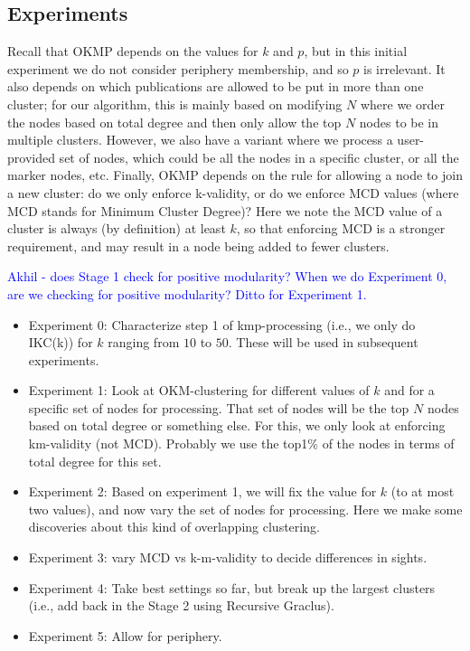 \documentclass{article}
\begin{document}
\subsection{Experiments}

 
Recall that OKMP depends on the values for $k$ and $p$, but in this initial experiment we do not 
consider periphery membership, and so $p$ is irrelevant.
It also depends on which publications are allowed to be
put in more than one cluster; for our algorithm, this is mainly based on modifying $N$ where 
we order the nodes based on total degree and then only allow the top $N$ nodes to be in multiple clusters.
However, we also have a variant where we process a user-provided set of nodes, which could be all the nodes in a specific cluster, or  all the marker nodes, etc. 
Finally, OKMP depends on the rule for allowing a node to join a new cluster: do we only enforce k-validity, or do
we enforce MCD values (where MCD stands for Minimum Cluster Degree)? Here we note the MCD value of a cluster is
always (by definition) at least $k$, so that enforcing MCD is a stronger requirement, and may result in a node being added to
fewer clusters.


\textcolor{blue}{Akhil - does Stage 1 check for positive modularity? When we do Experiment 0, are we checking for positive modularity? Ditto for Experiment 1.}

\begin{itemize}
\item 
Experiment 0: Characterize step 1 of kmp-processing (i.e., we only do IKC(k)) for $k$ ranging from $10$ to $50$. These will be used
in subsequent experiments.
\item Experiment 1:  Look at OKM-clustering for different values of $k$ and for a specific set of nodes for processing. That set of nodes
will be the top $N$ nodes based on total degree or something else. For this, we only look at enforcing km-validity (not MCD).  Probably we use the top1\% of the nodes in terms of total degree for this set. 
\item Experiment 2:  Based on experiment 1, we will fix the value for $k$ (to at most two values), and now vary the set of  nodes for processing.
Here we make some discoveries about this kind of overlapping clustering.
\item Experiment 3: vary MCD vs k-m-validity to decide differences in sights.
\item Experiment 4: Take best settings so far, but break up the largest clusters (i.e., add back in the Stage 2 using Recursive Graclus).
\item Experiment 5: Allow for periphery.
\end{itemize}
\end{document}
